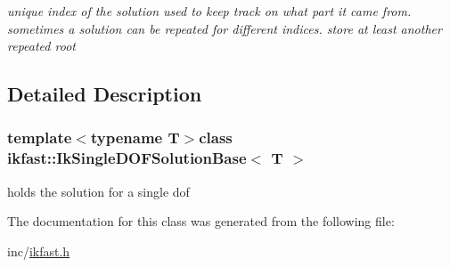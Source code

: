 \begin{DoxyCompactItemize}
\begin{DoxyCompactList}\small\item\em unique index of the solution used to keep track on what part it came from. sometimes a solution can be repeated for different indices. store at least another repeated root \end{DoxyCompactList}\end{DoxyCompactItemize}


\subsection{Detailed Description}
\subsubsection*{template$<$typename T$>$class ikfast\-::\-Ik\-Single\-D\-O\-F\-Solution\-Base$<$ T $>$}

holds the solution for a single dof 

The documentation for this class was generated from the following file\-:\begin{DoxyCompactItemize}
\item 
inc/\hyperlink{ikfast_8h}{ikfast.\-h}\end{DoxyCompactItemize}
